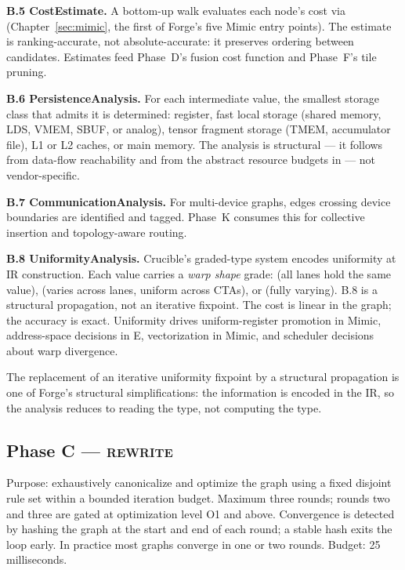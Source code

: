 \textbf{B.5 CostEstimate.}
A bottom-up walk evaluates each node's cost via  (Chapter~\ref{sec:mimic}, the first of Forge's five Mimic entry points).
The estimate is ranking-accurate, not absolute-accurate: it preserves ordering between candidates.
Estimates feed Phase~D's fusion cost function and Phase~F's tile pruning.

\textbf{B.6 PersistenceAnalysis.}
For each intermediate value, the smallest storage class that admits it is determined: register, fast local storage (shared memory, LDS, VMEM, SBUF, or analog), tensor fragment storage (TMEM, accumulator file), L1 or L2 caches, or main memory.
The analysis is structural --- it follows from data-flow reachability and from the abstract resource budgets in  --- not vendor-specific.

\textbf{B.7 CommunicationAnalysis.}
For multi-device graphs, edges crossing device boundaries are identified and tagged.
Phase~K consumes this for collective insertion and topology-aware routing.

\textbf{B.8 UniformityAnalysis.}
Crucible's graded-type system encodes uniformity at IR construction.
Each value carries a \emph{warp shape} grade:  (all lanes hold the same value),  (varies across lanes, uniform across CTAs), or  (fully varying).
B.8 is a structural propagation, not an iterative fixpoint.
The cost is linear in the graph; the accuracy is exact.
Uniformity drives uniform-register promotion in Mimic, address-space decisions in E, vectorization in Mimic, and scheduler decisions about warp divergence.

The replacement of an iterative uniformity fixpoint by a structural propagation is one of Forge's structural simplifications: the information is encoded in the IR, so the analysis reduces to reading the type, not computing the type.

\subsection{Phase C --- \textsc{rewrite}}
\label{sec:forge-phase-c}

Purpose: exhaustively canonicalize and optimize the  graph using a fixed disjoint rule set within a bounded iteration budget.
Maximum three rounds; rounds two and three are gated at optimization level O1 and above.
Convergence is detected by hashing the graph at the start and end of each round; a stable hash exits the loop early.
In practice most graphs converge in one or two rounds.
Budget: 25 milliseconds.

